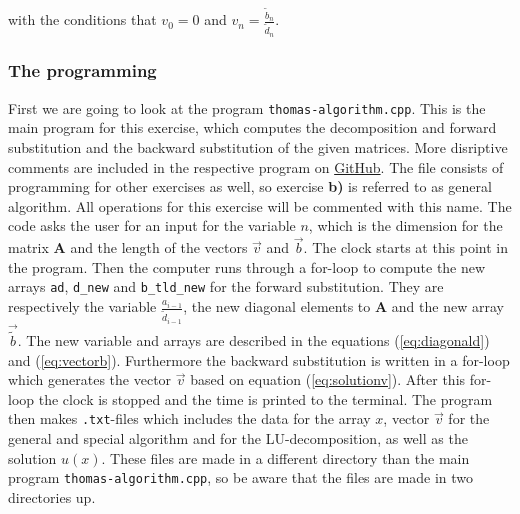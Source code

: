 \documentclass{article}
\begin{document}
    with the conditions that $v_0 = 0$ and $v_n = \frac{\tilde{b}_n}{\tilde{d}_n}$.

  \subsubsection{The programming}

    First we are going to look at the program \texttt{thomas-algorithm.cpp}. This is the main program for this exercise, which computes the decomposition and forward substitution and the backward substitution of the given matrices. More disriptive comments are included in the respective program on \href{https://github.com/Erikbgram/Fys3150}{GitHub}. The file consists of programming for other exercises as well, so exercise \textbf{b)} is referred to as general algorithm. All operations for this exercise will be commented with this name. The code asks the user for an input for the variable $n$, which is the dimension for the matrix \textbf{A} and the length of the vectors $\vec{v}$ and $\vec{b}$. The clock starts at this point in the program. Then the computer runs through a for-loop to compute the new arrays \texttt{ad}, \texttt{d\_new} and \texttt{b\_tld\_new} for the forward substitution. They are respectively the variable $\frac{a_{i-1}}{\tilde{d}_{i-1}}$, the new diagonal elements to \textbf{A}
    and the new array $\vec{\tilde{b}}$. The new variable and arrays are described in the equations (\ref{eq:diagonald}) and (\ref{eq:vectorb}). Furthermore the backward substitution is written in a for-loop which generates the vector $\vec{v}$ based on equation (\ref{eq:solutionv}). After this for-loop the clock is stopped and the time is printed to the terminal. The program then makes \texttt{.txt}-files which includes the data for the array $x$, vector $\vec{v}$ for the general and special algorithm and for the LU-decomposition, as well as the solution $u(x)$. These files are made in a different directory than the main program \texttt{thomas-algorithm.cpp}, so be aware that the files are made in two directories up. \\
\end{document}

